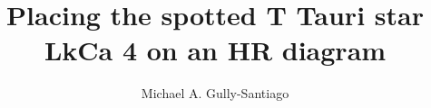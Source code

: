 \documentclass[12pt]{report}
\begin{document}
 
\title{Placing the spotted T Tauri star LkCa 4 on an HR diagram}

\author{Michael A. Gully-Santiago}



\end{document}
